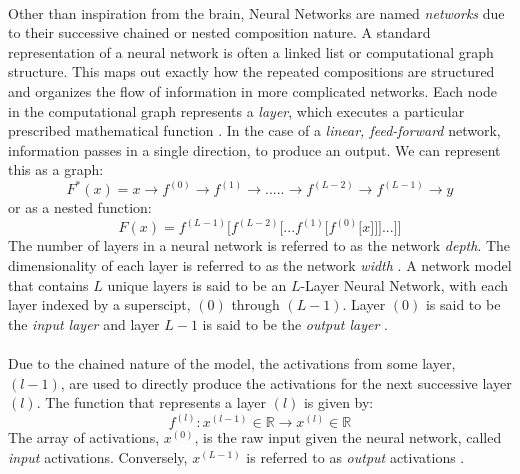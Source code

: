 \documentclass[12pt,letterpaper]{article}
\begin{document}
\paragraph*{}Other than inspiration from the brain, Neural Networks are named \textit{networks} due to their successive chained or nested composition nature. A standard representation of a neural network is often a linked list or computational graph structure. This maps out exactly how the repeated compositions are structured and organizes the flow of information in more complicated networks. Each node in the computational graph represents a \textit{layer}, which executes a particular prescribed mathematical function \cite{Goodfellow}. In the case of a \textit{linear, feed-forward} network, information passes in a single direction, to produce an output. We can represent this as a graph:
\begin{equation}
\label{eqn-FunctionGraph}
F^*(x) = x \rightarrow f^{(0)} \rightarrow f^{(1)} \rightarrow ..... \rightarrow
f^{(L-2)} \rightarrow f^{(L-1)} \rightarrow y
\end{equation}
or as a nested function:
\begin{equation}
\label{eqn-FunctionChain}
F(x) = f^{(L-1)}\big[f^{(L-2)}\big[...f^{(1)}\big[f^{(0)}\big[x]\big]\big]...\big]\big]
\end{equation}
The number of layers in a neural network is referred to as the network \textit{depth}. The dimensionality of each layer is referred to as the network \textit{width} \cite{Geron,Loy}.
A network model that contains $L$ unique layers is said to be an $L$-Layer Neural Network, with each layer indexed by a superscipt, $(0)$ through $(L-1)$. Layer $(0)$ is said to be the \textit{input layer} and layer $L-1$ is said to be the \textit{output layer} \cite{Geron,Loy}. 

\paragraph*{}Due to the chained nature of the model, the activations from some layer, $(l-1)$, are used to directly produce the activations for the next successive layer $(l)$. The function that represents a layer $(l)$ is given by:
\begin{equation}
\label{eqn-altLayerFunction}
f^{(l)} : x^{(l-1)} \in \mathbb{R} \rightarrow x^{(l)} \in \mathbb{R}
\end{equation}
The array of activations, $x^{(0)}$, is the raw input given the neural network, called \textit{input} activations. Conversely, $x^{(L-1)}$ is referred to as \textit{output} activations \cite{Geron,James,Loy}.
\end{document}
